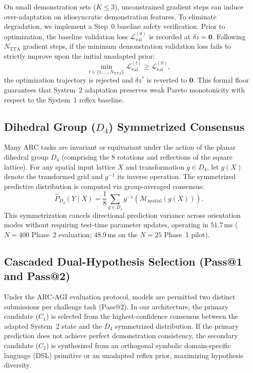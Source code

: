 \documentclass[11pt,a4paper]{article}
\theoremstyle{plain}
\theoremstyle{definition}
\theoremstyle{remark}
\begin{document}
On small demonstration sets ($K \le 3$), unconstrained gradient steps can induce over-adaptation on idiosyncratic demonstration features. To eliminate degradation, we implement a Step~0 baseline safety verification. Prior to optimization, the baseline validation loss $\mathcal{L}_{\mathrm{val}}^{(0)}$ is recorded at $\delta z = \mathbf{0}$. Following $N_{\mathrm{TTA}}$ gradient steps, if the minimum demonstration validation loss fails to strictly improve upon the initial unadapted prior:
\begin{equation}
    \min_{t \in \{1, \dots, N_{\mathrm{TTA}}\}} \mathcal{L}_{\mathrm{val}}^{(t)} \ge \mathcal{L}_{\mathrm{val}}^{(0)},
\end{equation}
the optimization trajectory is rejected and $\delta z^*$ is reverted to $\mathbf{0}$. This formal floor guarantees that System~2 adaptation preserves weak Pareto monotonicity with respect to the System~1 reflex baseline.

\subsection{Dihedral Group ($D_4$) Symmetrized Consensus}

Many ARC tasks are invariant or equivariant under the action of the planar dihedral group $D_4$ (comprising the 8 rotations and reflections of the square lattice). For any spatial input lattice $X$ and transformation $g \in D_4$, let $g(X)$ denote the transformed grid and $g^{-1}$ its inverse operation. The symmetrized predictive distribution is computed via group-averaged consensus:
\begin{equation}
    \hat{P}_{D_4}(Y \mid X) = \frac{1}{8} \sum_{g \in D_4} g^{-1} \left( \mathcal{M}_{\mathrm{spatial}}\left(g(X)\right) \right).
\end{equation}
This symmetrization cancels directional prediction variance across orientation modes without requiring test-time parameter updates, operating in $51.7$\,ms ($N = 400$ Phase~2 evaluation; $48.9$\,ms on the $N = 25$ Phase~1 pilot).

\subsection{Cascaded Dual-Hypothesis Selection (Pass@1 and Pass@2)}

Under the ARC-AGI evaluation protocol, models are permitted two distinct submissions per challenge task (Pass@2). In our architecture, the primary candidate ($C_1$) is selected from the highest-confidence consensus between the adapted System~2 state and the $D_4$ symmetrized distribution. If the primary prediction does not achieve perfect demonstration consistency, the secondary candidate ($C_2$) is synthesized from an orthogonal symbolic domain-specific language (DSL) primitive or an unadapted reflex prior, maximizing hypothesis diversity.
\end{document}
